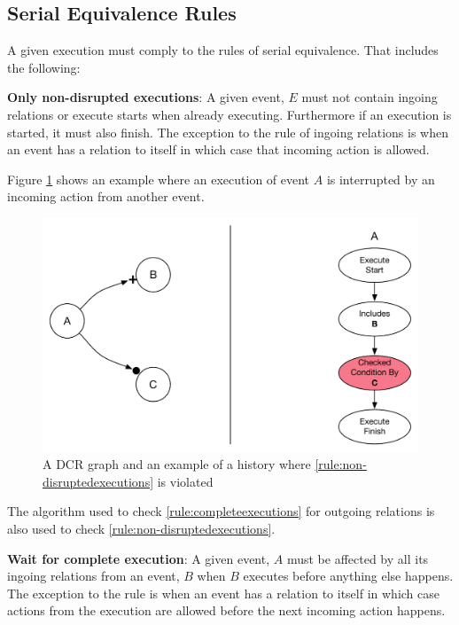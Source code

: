 	\subsection{Serial Equivalence Rules}
	A given execution must comply to the rules of serial equivalence. That includes the following:
	
	\begin{ruledef}
		\textbf{Only non-disrupted executions}: A given event, $E$ must not contain ingoing relations or execute starts when already executing. Furthermore if an execution is started, it must also finish. The exception to the rule of ingoing relations is when an event has a relation to itself in which case that incoming action is allowed.
		\label{rule:non-disruptedexecutions}
	\end{ruledef}
	
	\noindent Figure \ref{fig:validation:only-non-disrupted-executions} shows an example where an execution of event $A$ is interrupted by an incoming action from another event.
	
	\begin{figure}[H]
		\centering
		\includegraphics[width=.7\textwidth]{6validation/images/only-nondisrupted-executions.pdf}
		\caption{A DCR graph and an example of a history where \autoref{rule:non-disruptedexecutions} is violated}
		\label{fig:validation:only-non-disrupted-executions}
	\end{figure}
		
	\noindent The algorithm used to check \autoref{rule:completeexecutions} for outgoing relations is also used to check \autoref{rule:non-disruptedexecutions}.
	
	\begin{ruledef}
		\textbf{Wait for complete execution}: A given event, $A$ must be affected by all its ingoing relations from an event, $B$ when $B$ executes before anything else happens. The exception to the rule is when an event has a relation to itself in which case actions from the execution are allowed before the next incoming action happens. 
		\label{rule:wait-for-complete-execution}
	\end{ruledef}
	
